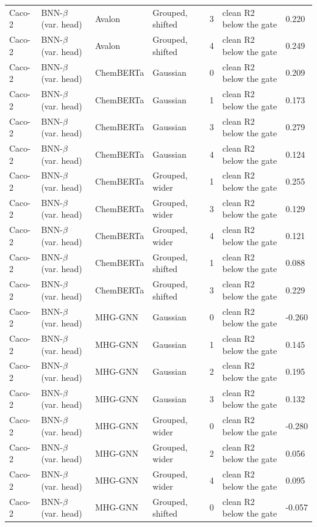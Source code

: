 {\begin{longtable}{llllcll}
Caco-2 & BNN-$\beta$ (var. head) & Avalon & Grouped, shifted & 3 & clean R2 below the gate & 0.220 \\
Caco-2 & BNN-$\beta$ (var. head) & Avalon & Grouped, shifted & 4 & clean R2 below the gate & 0.249 \\
Caco-2 & BNN-$\beta$ (var. head) & ChemBERTa & Gaussian & 0 & clean R2 below the gate & 0.209 \\
Caco-2 & BNN-$\beta$ (var. head) & ChemBERTa & Gaussian & 1 & clean R2 below the gate & 0.173 \\
Caco-2 & BNN-$\beta$ (var. head) & ChemBERTa & Gaussian & 3 & clean R2 below the gate & 0.279 \\
Caco-2 & BNN-$\beta$ (var. head) & ChemBERTa & Gaussian & 4 & clean R2 below the gate & 0.124 \\
Caco-2 & BNN-$\beta$ (var. head) & ChemBERTa & Grouped, wider & 1 & clean R2 below the gate & 0.255 \\
Caco-2 & BNN-$\beta$ (var. head) & ChemBERTa & Grouped, wider & 3 & clean R2 below the gate & 0.129 \\
Caco-2 & BNN-$\beta$ (var. head) & ChemBERTa & Grouped, wider & 4 & clean R2 below the gate & 0.121 \\
Caco-2 & BNN-$\beta$ (var. head) & ChemBERTa & Grouped, shifted & 1 & clean R2 below the gate & 0.088 \\
Caco-2 & BNN-$\beta$ (var. head) & ChemBERTa & Grouped, shifted & 3 & clean R2 below the gate & 0.229 \\
Caco-2 & BNN-$\beta$ (var. head) & MHG-GNN & Gaussian & 0 & clean R2 below the gate & -0.260 \\
Caco-2 & BNN-$\beta$ (var. head) & MHG-GNN & Gaussian & 1 & clean R2 below the gate & 0.145 \\
Caco-2 & BNN-$\beta$ (var. head) & MHG-GNN & Gaussian & 2 & clean R2 below the gate & 0.195 \\
Caco-2 & BNN-$\beta$ (var. head) & MHG-GNN & Gaussian & 3 & clean R2 below the gate & 0.132 \\
Caco-2 & BNN-$\beta$ (var. head) & MHG-GNN & Grouped, wider & 0 & clean R2 below the gate & -0.280 \\
Caco-2 & BNN-$\beta$ (var. head) & MHG-GNN & Grouped, wider & 2 & clean R2 below the gate & 0.056 \\
Caco-2 & BNN-$\beta$ (var. head) & MHG-GNN & Grouped, wider & 4 & clean R2 below the gate & 0.095 \\
Caco-2 & BNN-$\beta$ (var. head) & MHG-GNN & Grouped, shifted & 0 & clean R2 below the gate & -0.057 \\

\end{longtable}}
